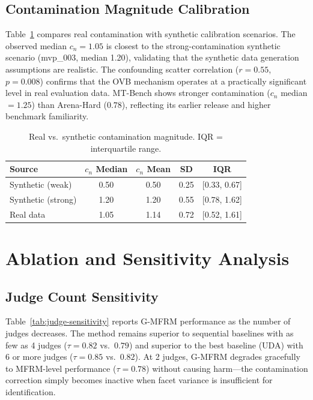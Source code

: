 \documentclass[11pt]{article}
\newcommand{\gmfrm}{\textsc{G-MFRM}}
\newcommand{\cn}{c_n}
\begin{document}
\subsection{Contamination Magnitude Calibration}
\label{sec:magnitude}

Table~\ref{tab:contamination-magnitude} compares real contamination with synthetic calibration scenarios. The observed median $\cn = 1.05$ is closest to the strong-contamination synthetic scenario (mvp\_003, median 1.20), validating that the synthetic data generation assumptions are realistic. The confounding scatter correlation ($r = 0.55$, $p = 0.008$) confirms that the OVB mechanism operates at a practically significant level in real evaluation data. MT-Bench shows stronger contamination ($\cn$ median $= 1.25$) than Arena-Hard ($0.78$), reflecting its earlier release and higher benchmark familiarity.

\begin{table}[t]
\centering
\caption{Real vs.\ synthetic contamination magnitude. IQR = interquartile range.}
\label{tab:contamination-magnitude}
\small
\begin{tabular}{@{}lcccc@{}}
\toprule
Source & $\cn$ Median & $\cn$ Mean & SD & IQR \\
\midrule
Synthetic (weak) & 0.50 & 0.50 & 0.25 & [0.33, 0.67] \\
Synthetic (strong) & 1.20 & 1.20 & 0.55 & [0.78, 1.62] \\
Real data & 1.05 & 1.14 & 0.72 & [0.52, 1.61] \\
\bottomrule
\end{tabular}
\end{table}

\section{Ablation and Sensitivity Analysis}
\label{sec:sensitivity}

\subsection{Judge Count Sensitivity}

Table~\ref{tab:judge-sensitivity} reports \gmfrm{} performance as the number of judges decreases. The method remains superior to sequential baselines with as few as 4 judges ($\tau = 0.82$ vs.\ $0.79$) and superior to the best baseline (UDA) with 6 or more judges ($\tau = 0.85$ vs.\ $0.82$). At 2 judges, \gmfrm{} degrades gracefully to MFRM-level performance ($\tau = 0.78$) without causing harm---the contamination correction simply becomes inactive when facet variance is insufficient for identification.
\end{document}
